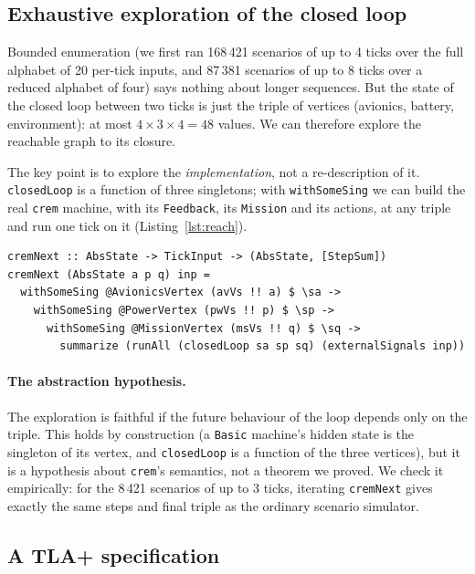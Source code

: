 \documentclass[review]{jfp-epi}
\newcommand{\crem}{\texttt{crem}}
\newcommand{\code}[1]{\texttt{#1}}
\begin{document}
\subsection{Exhaustive exploration of the closed loop}
\label{sec:reach}

Bounded enumeration (we first ran 168\,421 scenarios of up to 4 ticks over the full alphabet of 20 per-tick inputs, and 87\,381 scenarios of up to 8 ticks over a reduced alphabet of four) says nothing about longer sequences. But the state of the closed loop between two ticks is just the triple of vertices (avionics, battery, environment): at most $4\times3\times4=48$ values. We can therefore explore the reachable graph to its closure.

The key point is to explore the \emph{implementation}, not a re-description of it. \code{closedLoop} is a function of three singletons; with \code{withSomeSing} we can build the real \crem{} machine, with its \code{Feedback}, its \code{Mission} and its actions, at any triple and run one tick on it (Listing~\ref{lst:reach}).

\begin{lstlisting}[caption={One tick of the real \crem{} loop from an arbitrary triple of vertices.},label={lst:reach}]
cremNext :: AbsState -> TickInput -> (AbsState, [StepSum])
cremNext (AbsState a p q) inp =
  withSomeSing @AvionicsVertex (avVs !! a) $ \sa ->
    withSomeSing @PowerVertex (pwVs !! p) $ \sp ->
      withSomeSing @MissionVertex (msVs !! q) $ \sq ->
        summarize (runAll (closedLoop sa sp sq) (externalSignals inp))
\end{lstlisting}

\paragraph{The abstraction hypothesis.} The exploration is faithful if the future behaviour of the loop depends only on the triple. This holds by construction (a \code{Basic} machine's hidden state is the singleton of its vertex, and \code{closedLoop} is a function of the three vertices), but it is a hypothesis about \crem{}'s semantics, not a theorem we proved. We check it empirically: for the 8\,421 scenarios of up to 3 ticks, iterating \code{cremNext} gives exactly the same steps and final triple as the ordinary scenario simulator.

\subsection{A TLA+ specification}
\end{document}
